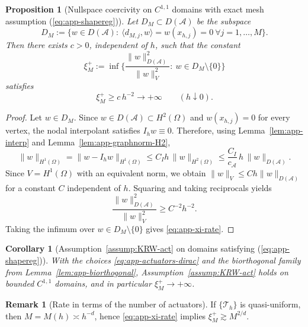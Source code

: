 \documentclass[11pt,a4paper]{article}
\numberwithin{equation}{section}
\newtheorem{proposition}[theorem]{Proposition}
\newtheorem{corollary}[theorem]{Corollary}
\theoremstyle{definition}
\newtheorem{remark}[theorem]{Remark}
\newcommand{\1}{\mathbbm{1}}
\begin{document}
\begin{proposition}[Nullspace coercivity on $C^{1,1}$ domains with exact mesh assumption (\ref{eq:app-shapereg})]
\label{prop:app-xi-diverges}
Let $D_M\subset D(\mathcal A)$ be the subspace
\[
D_M:=\{w\in D(\mathcal A):\ \langle d_{M,j},w\rangle = w(x_{h,j})=0\ \forall j=1,\dots,M\}.
\]
Then there exists $c>0$, independent of $h$, such that the constant
\[
\xi_M^+ := \inf\Big\{\frac{\|w\|_{D(\mathcal A)}^2}{\|w\|_V^2}:\ w\in D_M\setminus\{0\}\Big\}
\]
satisfies
\begin{equation}
\label{eq:app-xi-rate}
\xi_M^+ \ge c\,h^{-2}\longrightarrow +\infty\qquad (h\downarrow 0).
\end{equation}
\end{proposition}

\begin{proof}
Let $w\in D_M$. Since $w\in D(\mathcal A)\subset H^2(\Omega)$ and $w(x_{h,j})=0$ for every vertex, the nodal interpolant
satisfies $I_h w\equiv 0$.
Therefore, using Lemma~\ref{lem:app-interp} and Lemma~\ref{lem:app-graphnorm-H2},
\[
\|w\|_{H^1(\Omega)} = \|w-I_h w\|_{H^1(\Omega)} \le C_I h\,\|w\|_{H^2(\Omega)}
\le \frac{C_I}{c_\mathcal A}\, h\,\|w\|_{D(\mathcal A)}.
\]
Since $V=H^1(\Omega)$ with an equivalent norm, we obtain $\|w\|_V\le C h\|w\|_{D(\mathcal A)}$ for a constant $C$ independent
of $h$. Squaring and taking reciprocals yields
\[
\frac{\|w\|_{D(\mathcal A)}^2}{\|w\|_V^2} \ge C^{-2} h^{-2}.
\]
Taking the infimum over $w\in D_M\setminus\{0\}$ gives \eqref{eq:app-xi-rate}.
\end{proof}

\begin{corollary}[Assumption~\ref{assump:KRW-act} on domains satisfying (\ref{eq:app-shapereg})]
\label{cor:app-KRW-act}
With the choices \eqref{eq:app-actuators-dirac} and the biorthogonal family from Lemma~\ref{lem:app-biorthogonal},
Assumption~\ref{assump:KRW-act} holds on bounded $C^{1,1}$ domains, and in particular
$\xi_M^+\to+\infty$.
\end{corollary}

\begin{remark}[Rate in terms of the number of actuators]
If $\{\mathcal T_h\}$ is quasi-uniform, then $M=M(h)\asymp h^{-d}$, hence \eqref{eq:app-xi-rate} implies
$\xi_M^+\gtrsim M^{2/d}$.
\end{remark}
\end{document}
